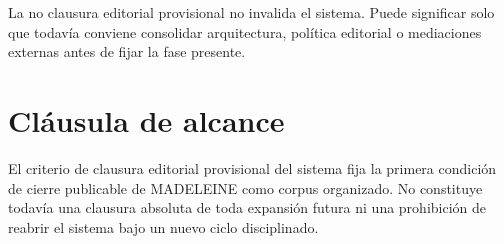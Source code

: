 \begin{observation}
La no clausura editorial provisional no invalida el sistema. Puede significar solo que todavía conviene consolidar arquitectura, política editorial o mediaciones externas antes de fijar la fase presente.
\end{observation}

\section{Cláusula de alcance}
\begin{observation}
El criterio de clausura editorial provisional del sistema fija la primera condición de cierre publicable de MADELEINE como corpus organizado. No constituye todavía una clausura absoluta de toda expansión futura ni una prohibición de reabrir el sistema bajo un nuevo ciclo disciplinado.
\end{observation}

